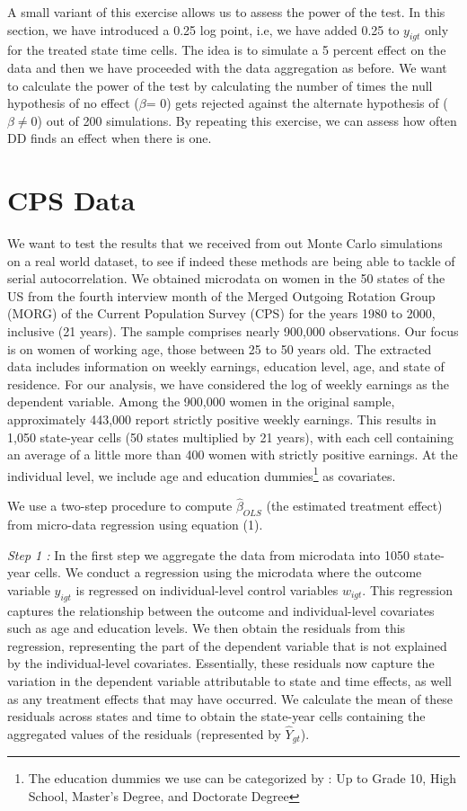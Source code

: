\documentclass[11pt, a4paper, leqno]{article}
\begin{document}
A small variant of this exercise allows us to assess the power of the test. In this section, we have introduced a 0.25 log point, i.e, we have added 0.25 to $y_{igt}$ only for the treated state time cells.
The idea is to simulate a 5 percent effect on the data and then we have proceeded with the data aggregation as before. We want to calculate the power of the test by calculating the number of times the null hypothesis of no effect ($\beta$= 0) gets rejected against the alternate hypothesis of ($\beta \neq 0$) out of 200 simulations.
By repeating this exercise, we can assess how often DD finds an effect when there is one. 


\section{CPS Data}
\label{cps}

We want to test the results that we received from out Monte Carlo simulations on a real world dataset, to see if indeed these methods are being able to tackle of serial autocorrelation.
We obtained microdata on women in the 50 states of the US from the fourth interview month of the Merged Outgoing Rotation Group (MORG) of the Current Population Survey (CPS) for the years 1980 to 2000, inclusive (21 years). The sample comprises nearly 900,000 observations. Our focus is on women of working age, those between 25 to 50 years old. The extracted data includes information on weekly earnings, education level, age, and state of residence. For our analysis, we have considered the log of weekly earnings as the dependent variable. Among the 900,000 women in the original sample, 
approximately 443,000 report strictly positive weekly earnings. This results in 1,050 state-year cells (50 states multiplied by 21 years), with each cell containing an average of a little more than 400 women with strictly positive earnings. At the individual level, we include age and education dummies\footnote{The education dummies we use can be categorized by : Up to Grade 10, High School, Master’s Degree, and Doctorate Degree} as covariates.

We use a two-step procedure to compute $\hat{\beta}_{OLS}$ (the estimated treatment effect) from micro-data regression using equation (1).

\textit{Step 1 :}
In the first step we aggregate the data from microdata into 1050 state-year cells. We conduct a regression using the microdata where the outcome variable $y_{igt}$ is regressed on individual-level control variables $w_{igt}$. This regression captures the relationship between the outcome and individual-level covariates such as age and education levels. We then obtain the residuals from this regression, representing the part of the dependent variable that is not explained by the individual-level covariates. 
Essentially, these residuals now capture the variation in the dependent variable attributable to state and time effects, as well as any treatment effects that may have occurred. We calculate the mean of these residuals across states and time to obtain the state-year cells containing the aggregated values of the residuals (represented by $\hat{Y}_{gt}$).
\end{document}
